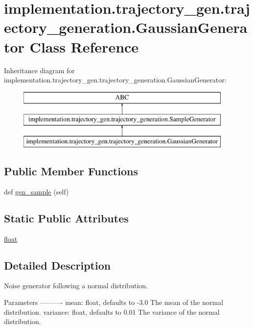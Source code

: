 \hypertarget{classimplementation_1_1trajectory__gen_1_1trajectory__generation_1_1_gaussian_generator}{}\section{implementation.\+trajectory\+\_\+gen.\+trajectory\+\_\+generation.\+Gaussian\+Generator Class Reference}
\label{classimplementation_1_1trajectory__gen_1_1trajectory__generation_1_1_gaussian_generator}
Inheritance diagram for implementation.\+trajectory\+\_\+gen.\+trajectory\+\_\+generation.\+Gaussian\+Generator\+:\begin{figure}[H]
\begin{center}
\leavevmode
\includegraphics[height=3.000000cm]{classimplementation_1_1trajectory__gen_1_1trajectory__generation_1_1_gaussian_generator}
\end{center}
\end{figure}
\subsection*{Public Member Functions}
\begin{DoxyCompactItemize}
\item 
def \hyperlink{classimplementation_1_1trajectory__gen_1_1trajectory__generation_1_1_gaussian_generator_ae6f939caa54816639160373174ddd958}{gen\+\_\+sample} (self)
\end{DoxyCompactItemize}
\subsection*{Static Public Attributes}
\begin{DoxyCompactItemize}
\item 
\hyperlink{classimplementation_1_1trajectory__gen_1_1trajectory__generation_1_1_gaussian_generator_a350c4200c58265ebffcc1c437b572cdd}{float}
\end{DoxyCompactItemize}


\subsection{Detailed Description}
\begin{DoxyVerb}Noise generator following a normal distribution.

Parameters
----------
    mean: float, defaults to -3.0
        The mean of the normal distribution.
    variance: float, defaults to 0.01
        The variance of the normal distribution.
\end{DoxyVerb}
 

